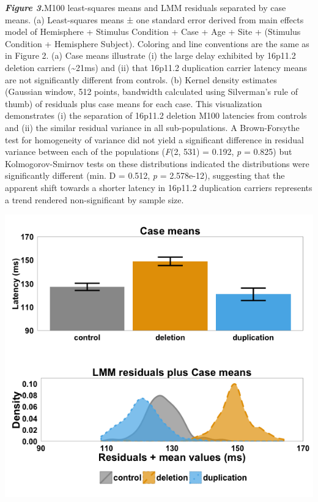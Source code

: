 \documentclass[]{article}
\begin{document}
\textbf{\emph{Figure 3.}}M100 least-squares means and LMM residuals
separated by case means. (a) Least-squares means ± one standard error
derived from main effects model of Hemisphere + Stimulus Condition +
Case + Age + Site + (Stimulus Condition + Hemisphere \textbar{}
Subject). Coloring and line conventions are the same as in Figure 2. (a)
Case means illustrate (i) the large delay exhibited by 16p11.2 deletion
carriers (\textasciitilde{}21ms) and (ii) that 16p11.2 duplication
carrier latency means are not significantly different from controls. (b)
Kernel density estimates (Gaussian window, 512 points, bandwidth
calculated using Silverman's rule of thumb) of residuals plus case means
for each case. This visualization demonstrates (i) the separation of
16p11.2 deletion M100 latencies from controls and (ii) the similar
residual variance in all sub-populations. A Brown-Forsythe test for
homogeneity of variance did not yield a significant difference in
residual variance between each of the populations (\emph{F}(2, 531) =
0.192, \emph{p} = 0.825) but Kolmogorov-Smirnov tests on these
distributions indicated the distributions were significantly different
(min. D = 0.512, \emph{p} = 2.578e-12), suggesting that the apparent
shift towards a shorter latency in 16p11.2 duplication carriers
represents a trend rendered non-significant by sample size.

\includegraphics{figure-3-resubmission.png}
\end{document}
